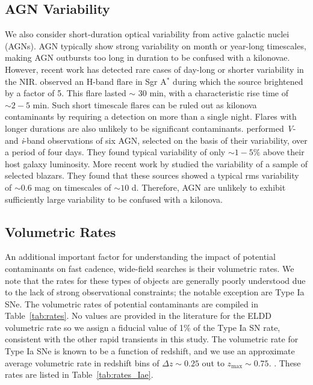 \subsection{AGN Variability}
\label{sec:agns}
We also consider short-duration optical variability from active galactic nuclei (AGNs). AGN typically show strong variability on month or year-long timescales, making AGN outbursts too long in duration to be confused with a kilonovae. However, recent work has detected rare cases of day-long  or shorter variability in the NIR. \citet{Genzel+03} observed an H-band flare in Sgr A$^{*}$ during which the source brightened by a factor of 5. This flare lasted $\sim$ 30 min, with a characteristic rise time of $\sim2-5$ min. Such short timescale flares can be ruled out as kilonova contaminants by requiring a detection on more than a single night. Flares with longer durations are also unlikely to be significant contaminants. \citet{Totani+05} performed {\em V}- and {\em i}-band observations of six AGN, selected on the basis of their variability, over a period of four days. They found typical variability of only $\sim1-5\%$ above their host galaxy luminosity. More recent work by \citet{Ruan+012} studied the variability of a sample of \fermi selected blazars. They found that these sources showed a typical rms variability of $\sim0.6$ mag on timescales of $\sim 10$ d. Therefore, AGN are unlikely to exhibit sufficiently large variability to be confused with a kilonova.
   
\subsection{Volumetric Rates}
\label{sec:rates}
An additional important factor for understanding the impact of potential contaminants on fast cadence, wide-field searches is their volumetric rates. We note that the rates for these types of objects are generally poorly understood due to the lack of strong observational constraints; the notable exception are Type Ia SNe. The volumetric rates of potential contaminants are compiled in Table~\ref{tab:rates}. No values are provided in the literature for the ELDD volumetric rate so we assign a fiducial value of 1\% of the Type Ia SN rate, consistent with the other rapid transients in this study. The volumetric rate for Type Ia SNe is known to be a function of redshift, and we use an approximate average volumetric rate in redshift bins of $\Delta z \sim 0.25$ out to $z_{\text{max}} \sim 0.75$. \citep[][and references therein]{Li+11,Graur+14}. These rates are listed in Table~\ref{tab:rates_Iae}.

